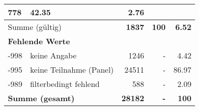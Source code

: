 \begin{longtable}{lXrrr}
       \num{778} &
       \num[round-mode=places,round-precision=2]{42.35} &
         \num[round-mode=places,round-precision=2]{2.76} \\
     \midrule
     \multicolumn{2}{l}{Summe (gültig)} &
       \textbf{\num{1837}} &
     \textbf{\num{100}} &
       \textbf{\num[round-mode=places,round-precision=2]{6.52}} \\
     \multicolumn{5}{l}{\textbf{Fehlende Werte}}\\
       -998 &
       keine Angabe &
         \num{1246} &
        - &
         \num[round-mode=places,round-precision=2]{4.42} \\
       -995 &
       keine Teilnahme (Panel) &
         \num{24511} &
        - &
         \num[round-mode=places,round-precision=2]{86.97} \\
       -989 &
       filterbedingt fehlend &
         \num{588} &
        - &
         \num[round-mode=places,round-precision=2]{2.09} \\
     \midrule
     \multicolumn{2}{l}{\textbf{Summe (gesamt)}} &
          \textbf{\num{28182}} &
        \textbf{-} &
        \textbf{\num{100}} \\
     \bottomrule
     \end{longtable}
     
